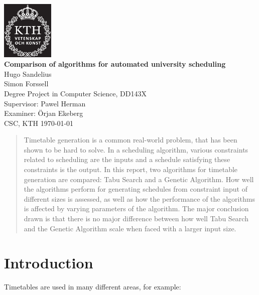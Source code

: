 \documentclass[titlepage,a4paper]{article}
\author{
\textbf{Group 31} \\
Hugo Sandelius, hugosa@kth.se \\ 
Simon Forssell, sifo@kth.se \\
}
\begin{document}
\begin{titlepage}
\begin{center}
\includegraphics[width=2.5cm]{KTH_Logotyp_Sv_2013.eps}\\[1.5cm]
\textbf{\LARGE Comparison of algorithms for automated university scheduling}\\
\vfill
{\Large Hugo Sandelius}\\
{\Large Simon Forssell}\\[3cm]
{\large Degree Project in Computer Science, DD143X}\\[0.07cm]
{\large Supervisor: Pawel Herman}\\
{\large Examiner: Örjan Ekeberg}\\[3cm]
{\large CSC, KTH \today}
\end{center}
\end{titlepage}


\begin{abstract}
Timetable generation is a common real-world problem, that has been shown to be hard to solve. In a scheduling algorithm, various constraints related to scheduling are the inputs and a schedule satisfying these constraints is the output.
In this report, two algorithms for timetable generation are compared: Tabu Search and a Genetic Algorithm. How well the algorithms perform for generating schedules from constraint input of different sizes is assessed, as well as how the performance of the algorithms is affected by varying parameters of the algorithm.
The major conclusion drawn is that there is no major difference between how well Tabu Search and the Genetic Algorithm scale when faced with a larger input size.
\end{abstract}

\tableofcontents{}

\pagebreak
\section{Introduction}
Timetables are used in many different areas, for example:
\end{document}
